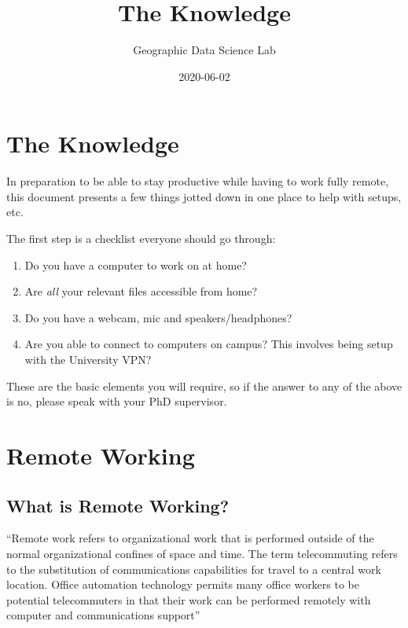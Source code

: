 \documentclass[
]{book}
\title{The Knowledge}
\author{Geographic Data Science Lab}
\date{2020-06-02}
\providecommand{\tightlist}{%
  \setlength{\itemsep}{0pt}\setlength{\parskip}{0pt}}
\begin{document}
\maketitle

{
\setcounter{tocdepth}{1}
\tableofcontents
}
\hypertarget{the-knowledge}{%
\chapter{The Knowledge}\label{the-knowledge}}

In preparation to be able to stay productive while having to work fully remote, this document presents a few things jotted down in one place to help with setups, etc.

The first step is a checklist everyone should go through:

\begin{enumerate}
\def\labelenumi{\arabic{enumi}.}
\tightlist
\item
  Do you have a computer to work on at home?
\item
  Are \emph{all} your relevant files accessible from home?
\item
  Do you have a webcam, mic and speakers/headphones?
\item
  Are you able to connect to computers on campus? This involves being setup with the University VPN?
\end{enumerate}

These are the basic elements you will require, so if the answer to any of the above is no, please speak with your PhD supervisor.

\hypertarget{remote-working}{%
\chapter{Remote Working}\label{remote-working}}

\hypertarget{what-is-remote-working}{%
\section{What is Remote Working?}\label{what-is-remote-working}}

``Remote work refers to organizational work that is performed outside of the normal organizational confines of space and time. The term telecommuting refers to the substitution of communications capabilities for travel to a central work location. Office automation technology permits many office workers to be potential telecommuters in that their work can be performed remotely with computer and communications support'' \citep{olson1983remote}
\end{document}
